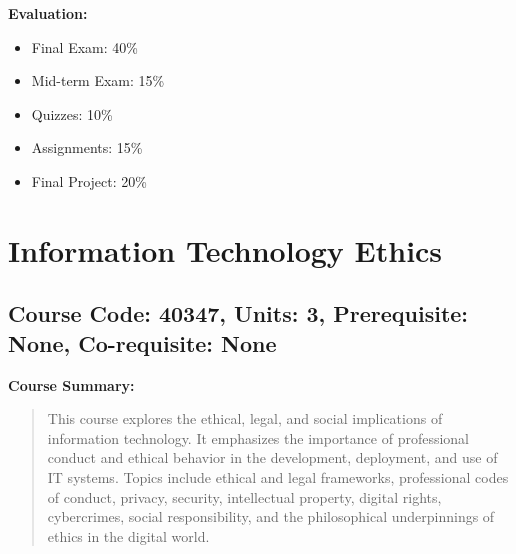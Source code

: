 \documentclass[12pt]{article}
\begin{document}
\textbf{Evaluation:}
\begin{itemize}
    \item Final Exam: 40\%
    \item Mid-term Exam: 15\%
    \item Quizzes: 10\%
    \item Assignments: 15\%
    \item Final Project: 20\%
\end{itemize}

\newpage

\section{Information Technology Ethics}
\subsection*{Course Code: 40347, Units: 3, Prerequisite: None, Co-requisite: None}

\textbf{Course Summary:} 
\begin{quote}
This course explores the ethical, legal, and social implications of information technology. It emphasizes the importance of professional conduct and ethical behavior in the development, deployment, and use of IT systems. Topics include ethical and legal frameworks, professional codes of conduct, privacy, security, intellectual property, digital rights, cybercrimes, social responsibility, and the philosophical underpinnings of ethics in the digital world.
\end{quote}
\end{document}

